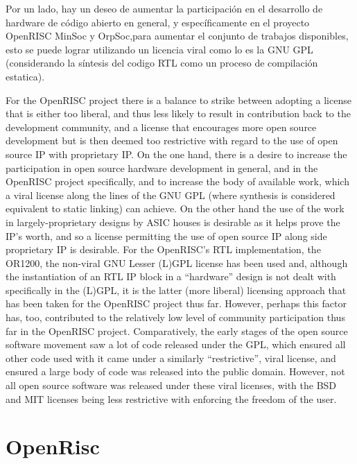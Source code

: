 Por un lado, hay un deseo de aumentar la participación en el desarrollo de hardware de código abierto en general, y específicamente en el proyecto OpenRISC MinSoc y OrpSoc,para aumentar el conjunto de trabajos disponibles, esto se puede lograr utilizando un licencia viral como lo es la GNU GPL (considerando la síntesis del codigo RTL como un proceso de compilación estatica). 



For the OpenRISC project there is a balance to strike between adopting a license
that is either too liberal, and thus less likely to result in contribution back to
the development community, and a license that encourages more open source development
but is then deemed too restrictive with regard to the use of open source
IP with proprietary IP. On the one hand, there is a desire to increase the participation
in open source hardware development in general, and in the OpenRISC
project specifically, and to increase the body of available work, which a viral license
along the lines of the GNU GPL (where synthesis is considered equivalent to static
linking) can achieve. On the other hand the use of the work in largely-proprietary
designs by ASIC houses is desirable as it helps prove the IP’s worth, and so a license
permitting the use of open source IP along side proprietary IP is desirable.
For the OpenRISC’s RTL implementation, the OR1200, the non-viral GNU Lesser
(L)GPL license has been used and, although the instantiation of an RTL IP block
in a “hardware” design is not dealt with specifically in the (L)GPL, it is the latter
(more liberal) licensing approach that has been taken for the OpenRISC project
thus far.
However, perhaps this factor has, too, contributed to the relatively low level
of community participation thus far in the OpenRISC project. Comparatively,
the early stages of the open source software movement saw a lot of code released
under the GPL, which ensured all other code used with it came under a similarly
“restrictive”, viral license, and ensured a large body of code was released into the
public domain. However, not all open source software was released under these viral
licenses, with the BSD and MIT licenses being less restrictive with enforcing the
freedom of the user.

\section{OpenRisc}

